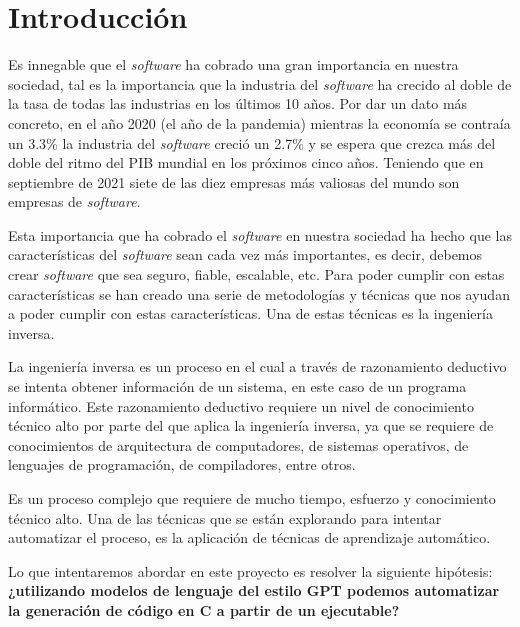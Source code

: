 \chapter{Introducción}
\label{cap:introducion}

\setcounter{page}{1}


Es innegable que el \textit{software} ha cobrado una gran importancia en nuestra sociedad, tal es
la importancia que la industria del \textit{software} ha crecido al doble de la tasa de todas
las industrias en los últimos 10 años. Por dar un dato más concreto, en el año 2020
(el año de la pandemia) mientras la economía se contraía un 3.3\% la industria del
\textit{software} creció un 2.7\% y se espera que crezca más del doble del ritmo del PIB
mundial en los próximos cinco años. Teniendo que en septiembre de 2021 siete de las
diez empresas más valiosas del mundo son empresas de \textit{software}. \cite{IndustriaSoftware}

Esta importancia que ha cobrado el \textit{software} en nuestra sociedad ha hecho que
las características del \textit{software} sean cada vez más importantes, es decir, debemos
crear \textit{software} que sea seguro, fiable, escalable, etc. Para poder cumplir con
estas características se han creado una serie de metodologías y técnicas que nos ayudan
a poder cumplir con estas características. Una de estas técnicas es la ingeniería inversa.

La ingeniería inversa es un proceso en el cual a través de razonamiento deductivo se intenta
obtener información de un sistema, en este caso de un programa informático. Este razonamiento
deductivo requiere un nivel de conocimiento técnico alto por parte del que aplica la ingeniería
inversa, ya que se requiere de conocimientos de arquitectura de computadores, de sistemas
operativos, de lenguajes de programación, de compiladores, entre otros.

Es un proceso complejo que requiere de mucho tiempo, esfuerzo y conocimiento técnico alto.
Una de las técnicas que se están explorando para intentar automatizar el proceso, es la
aplicación de técnicas de aprendizaje automático.

Lo que intentaremos abordar en este proyecto es resolver la siguiente hipótesis: \textbf{¿utilizando
modelos de lenguaje del estilo GPT podemos automatizar la generación de código en C a partir de
un ejecutable?}

